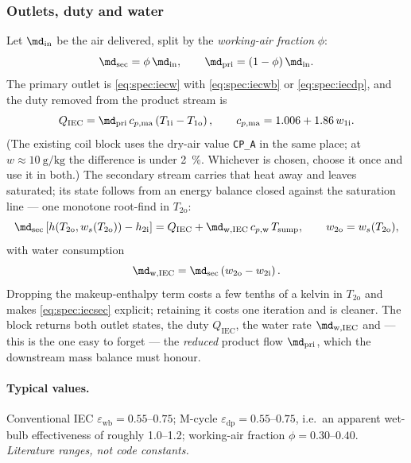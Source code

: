 \subsubsection{Outlets, duty and water}
Let $\md_{\mathrm{in}}$ be the air delivered, split by the \emph{working-air fraction} $\phi$:
\begin{equation}
\md_{\mathrm{sec}} = \phi\,\md_{\mathrm{in}} ,
\qquad
\md_{\mathrm{pri}} = (1-\phi)\,\md_{\mathrm{in}} .
\label{eq:spec:iecphi}
\end{equation}
The primary outlet is \eqref{eq:spec:iecw} with \eqref{eq:spec:iecwb} or \eqref{eq:spec:iecdp}, and
the duty removed from the product stream is
\begin{equation}
Q_{\mathrm{IEC}} = \md_{\mathrm{pri}}\,c_{p,\mathrm{ma}}\left(T_{\mathrm{1i}}-T_{\mathrm{1o}}\right),
\qquad c_{p,\mathrm{ma}} = 1.006 + 1.86\,w_{\mathrm{1i}} .
\label{eq:spec:iecQ}
\end{equation}
(The existing coil block uses the dry-air value \texttt{CP\_A} in the same place; at
$w\approx\SI{10}{\gram\per\kilogram}$ the difference is under \SI{2}{\percent}. Whichever is chosen,
choose it once and use it in both.) The secondary stream carries that heat away and leaves saturated;
its state follows from an energy balance closed against the saturation line --- one monotone
root-find in $T_{\mathrm{2o}}$:
\begin{equation}
\md_{\mathrm{sec}}\left[h\!\left(T_{\mathrm{2o}},w_{s}(T_{\mathrm{2o}})\right)-h_{\mathrm{2i}}\right]
= Q_{\mathrm{IEC}} + \md_{\mathrm{w,IEC}}\,c_{p,\mathrm{w}}\,T_{\mathrm{sump}} ,
\qquad
w_{\mathrm{2o}} = w_{s}(T_{\mathrm{2o}}) ,
\label{eq:spec:iecsec}
\end{equation}
with water consumption
\begin{equation}
\md_{\mathrm{w,IEC}} = \md_{\mathrm{sec}}\left(w_{\mathrm{2o}}-w_{\mathrm{2i}}\right) .
\label{eq:spec:iecwater}
\end{equation}
Dropping the makeup-enthalpy term costs a few tenths of a kelvin in $T_{\mathrm{2o}}$ and makes
\eqref{eq:spec:iecsec} explicit; retaining it costs one iteration and is cleaner. The block returns
both outlet states, the duty $Q_{\mathrm{IEC}}$, the water rate $\md_{\mathrm{w,IEC}}$ and --- this
is the one easy to forget --- the \emph{reduced} product flow $\md_{\mathrm{pri}}$, which the
downstream mass balance must honour.

\paragraph{Typical values.} Conventional IEC $\varepsilon_{\mathrm{wb}}=\numrange{0.55}{0.75}$;
M-cycle $\varepsilon_{\mathrm{dp}}=\numrange{0.55}{0.75}$, i.e.\ an apparent wet-bulb effectiveness of
roughly \numrange{1.0}{1.2}; working-air fraction $\phi=\numrange{0.30}{0.40}$. \emph{Literature
ranges, not code constants.}

